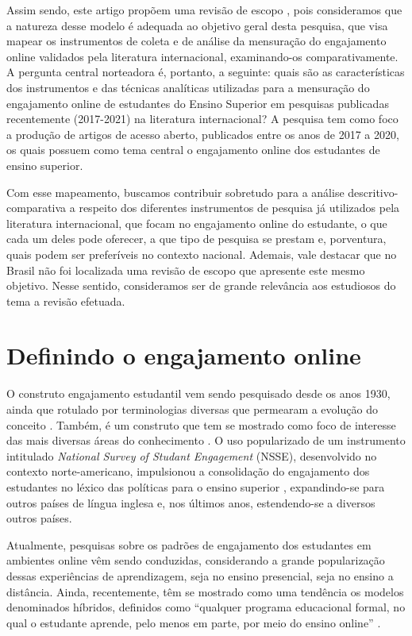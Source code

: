 \documentclass[portuguese]{textolivre}
\begin{document}
Assim sendo, este artigo propõem uma revisão de escopo \cite{tricco2018}, pois consideramos que a natureza desse modelo é adequada ao objetivo geral desta pesquisa, que visa mapear os instrumentos de coleta e de análise da mensuração do engajamento online validados pela literatura internacional, examinando-os comparativamente. A pergunta central norteadora é, portanto, a seguinte: quais são as características dos instrumentos e das técnicas analíticas utilizadas para a mensuração do engajamento online de estudantes do Ensino Superior em pesquisas publicadas recentemente (2017-2021) na literatura internacional? A pesquisa tem como foco a produção de artigos de acesso aberto, publicados entre os anos de 2017 a 2020, os quais possuem como tema central o engajamento online dos estudantes de ensino superior.

Com esse mapeamento, buscamos contribuir sobretudo para a análise descritivo-comparativa a respeito dos diferentes instrumentos de pesquisa já utilizados pela literatura internacional, que focam no engajamento online do estudante, o que cada um deles pode oferecer, a que tipo de pesquisa se prestam e, porventura, quais podem ser preferíveis no contexto nacional. Ademais, vale destacar que no Brasil não foi localizada uma revisão de escopo que apresente este mesmo objetivo. Nesse sentido, consideramos ser de grande relevância aos estudiosos do tema a revisão efetuada.

\section{Definindo o engajamento online}
O construto engajamento estudantil vem sendo pesquisado desde os anos 1930, ainda que rotulado por terminologias diversas que permearam a evolução do conceito \cite{rigo2018}. Também, é um construto que tem se mostrado como foco de interesse das mais diversas áreas do conhecimento \cite{irala2020}. O uso popularizado de um instrumento intitulado \emph{National Survey of Studant Engagement} (NSSE), desenvolvido no contexto norte-americano, impulsionou a consolidação do engajamento dos estudantes no léxico das políticas para o ensino superior \cite{kuh2009}, expandindo-se para outros países de língua inglesa e, nos últimos anos, estendendo-se a diversos outros países.

Atualmente, pesquisas sobre os padrões de engajamento dos estudantes em ambientes online vêm sendo conduzidas, considerando a grande popularização dessas experiências de aprendizagem, seja no ensino presencial, seja no ensino a distância. Ainda, recentemente, têm se mostrado como uma tendência os modelos denominados híbridos, definidos como “qualquer programa educacional formal, no qual o estudante aprende, pelo menos em parte, por meio do ensino online” \cite[p. 34]{horn2015}.
\end{document}
